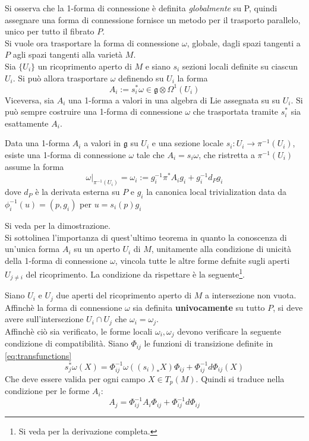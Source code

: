 Si osserva che la 1-forma di connessione è definita \emph{globalmente} su P, quindi
assegnare una forma di connessione fornisce un metodo per il trasporto parallelo,
unico per tutto il fibrato $P$.\\

Si vuole ora trasportare la forma di connessione $\omega$, globale, dagli spazi
tangenti a $P$ agli spazi tangenti alla varietà $M$.\\

Sia $\{U_i\}$ un ricoprimento aperto di $M$ e siano $s_i$ sezioni locali definite
su ciascun $U_i$. Si può allora trasportare $\omega$ definendo su $U_i$ la forma
$$
   A_i := s_i^* \omega \in \mathfrak{g} \otimes \Omega^1(U_i)
$$
Viceversa, sia $A_i$ una 1-forma a valori in una algebra di Lie assegnata su su $U_i$.
Si può sempre costruire una 1-forma di connessione $\omega$ che trasportata tramite
$s_i^*$ sia esattamente $A_i$.
\begin{theorem}
   Data una 1-forma $A_i$ a valori in $\mathfrak{g}$ su $U_i$ e una sezione locale
   $s_i : U_i \to \pi^{-1}(U_i)$, esiste una 1-forma di connessione $\omega$
   tale che $A_i = s_i \omega$, che ristretta a $\pi^{-1}(U_i)$ assume la forma
   $$
      \omega|_{\pi^{-1}(U_i)} = \omega_i := g_i^{-1} \pi^* A_i g_i + g_i^{-1} d_P g_i
   $$
   dove $d_P$ è la derivata esterna su $P$ e $g_i$ la canonica local trivialization
   data da $\phi_i^{-1}(u) = (p,g_i)$ per $u = s_i(p)g_i$
\end{theorem}
Si veda \cite{nakahara} per la dimostrazione.\\

Si sottolinea l'importanza di quest'ultimo teorema in quanto la conoscenza di un'unica
forma $A_i$ su un aperto $U_i$ di $M$, unitamente alla condizione di unicità della
1-forma di connessione $\omega$, vincola tutte le altre forme defnite sugli aperti
$U_{j\neq i}$ del ricoprimento. La condizione da rispettare è la seguente\footnote{
Si veda \cite{nakahara} per la derivazione completa.
}.

Siano $U_i$ e $U_j$ due aperti del ricoprimento aperto di $M$ a intersezione non vuota.
Affinchè la forma di connessione $\omega$ sia definita \textbf{univocamente} su tutto $P$,
si deve avere sull'intersezione $U_i \cap U_j$ che $\omega_i = \omega_j$.\\
Affinchè ciò sia verificato, le forme locali $\omega_i,\omega_j$ devono verificare
la seguente condizione di compatibilità. Siano $\Phi_{ij}$ le funzioni di transizione
definite in \ref{eq:transfunctions}
$$
   s^*_j \omega (X) = \Phi_{ij}^{-1} \omega( (s_i)_*X ) \Phi_{ij}
                         + \Phi_{ij}^{-1}d\Phi_{ij}(X)
$$
Che deve essere valida per ogni campo $X \in T_p(M)$. Quindi si traduce nella
condizione per le forme $A_i$:
\begin{equation}\label{eq:condcompatibility}
   A_j = \Phi_{ij}^{-1} A_i \Phi_{ij} + \Phi_{ij}^{-1}d\Phi_{ij}
\end{equation}

